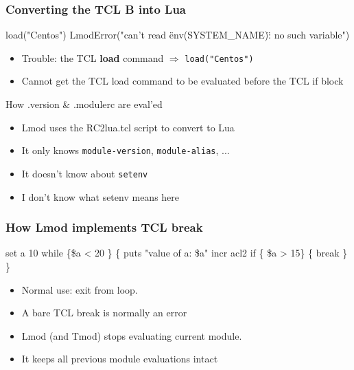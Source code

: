 \documentclass{beamer}
\begin{document}
\begin{frame}[fragile]
    \frametitle{Converting the TCL \textbf{B} into Lua}
 {\tiny
    \begin{semiverbatim}
   load("Centos")
   LmodError("can't read \"env(SYSTEM\_NAME)\": no such variable")
    \end{semiverbatim}
}
  \begin{itemize}
    \item Trouble: the TCL \textbf{load} command $\Rightarrow$
      \texttt{load("Centos")}
    \item Cannot get the TCL load command to be evaluated before the
      TCL if block
  \end{itemize}

\end{frame}

\begin{frame}{How .version \& .modulerc are eval'ed}
  \begin{itemize}
    \item Lmod uses the RC2lua.tcl script to convert to Lua
    \item It only knows \texttt{module-version},
      \texttt{module-alias}, ...
    \item It doesn't know about \texttt{setenv}
    \item I don't know what setenv means here
  \end{itemize}
\end{frame}

\begin{frame}[fragile]
    \frametitle{How Lmod implements TCL break}
 {\tiny
    \begin{semiverbatim}
    set a 10
    while \{\$a < 20 \} \{
       puts "value of a: \$a"
       incr acl2
       if \{ \$a > 15\} \{
          break
       \}
    \}
    \end{semiverbatim}
}
  \begin{itemize}
    \item Normal use: exit from loop.
    \item A bare TCL break is normally an error
    \item Lmod (and Tmod) stops evaluating current module.
    \item It keeps all previous module evaluations intact
  \end{itemize}
\end{frame}
\end{document}

